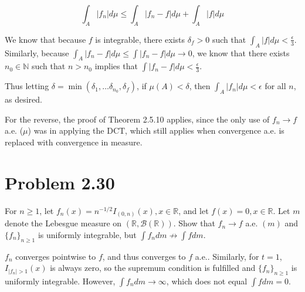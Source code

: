 \documentclass{article}
\newcommand{\R}{\mathbb{R}}
\newcommand{\N}{\mathbb{N}}
\newcommand{\B}{\mathcal{B}}
\begin{document}
\[
\int_A|f_n|d\mu \leq \int_A|f_n-f|d\mu + \int_A|f|d\mu
\]

We know that because $f$ is integrable, there exists $\delta_f>0$ such that $\int_A|f|d\mu < \frac{\epsilon}{3}$. Similarly, because $\int_A|f_n-f|d\mu \leq \int|f_n-f|d\mu \rightarrow 0$, we know that there exists $n_0 \in \N$ such that $n > n_0$ implies that $\int|f_n-f|d\mu < \frac{\epsilon}{3}$.

Thus letting $\delta = \min(\delta_1, \dots \delta_{n_0}, \delta_f)$, if $\mu(A) < \delta$, then $\int_A|f_n|d\mu < \epsilon$ for all $n$, as desired.

For the reverse, the proof of Theorem 2.5.10 applies, since the only use of $f_n \rightarrow f$ a.e. ($\mu$) was in applying the DCT, which still applies when convergence a.e. is replaced with convergence in measure.

\section*{Problem 2.30}

For $n \geq 1$, let $f_n(x) = n^{-1/2}I_{(0,n)}(x), x \in \R$, and let $f(x) = 0, x \in \R$. Let $m$ denote the Lebesgue measure on $(\R, \B(\R))$. Show that $f_n \rightarrow f$ a.e. $(m)$ and $\{f_n\}_{n \geq 1}$ is uniformly integrable, but $\int f_n dm \nrightarrow \int f dm$.

$f_n$ converges pointwise to $f$, and thus converges to $f$ a.e.. Similarly, for $t = 1$, $I_{|f_n| > 1}(x)$ is always zero, so the supremum condition is fulfilled and $\{f_n\}_{n \geq 1}$ is uniformly integrable. However, $\int f_n dm \rightarrow \infty$, which does not equal $\int f dm = 0$.
\end{document}
